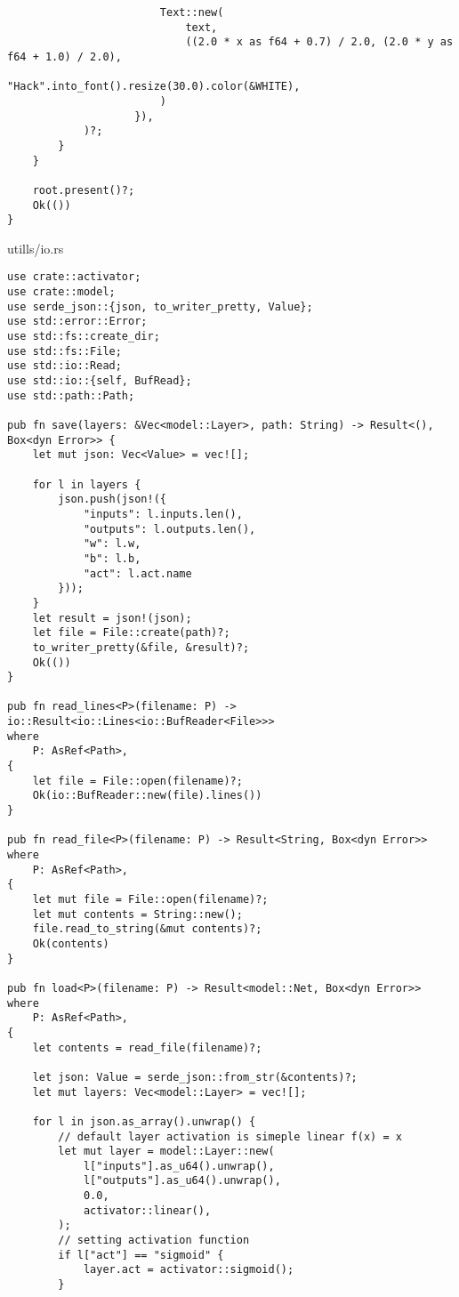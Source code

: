 \begin{verbatim}
                        Text::new(
                            text,
                            ((2.0 * x as f64 + 0.7) / 2.0, (2.0 * y as f64 + 1.0) / 2.0),
                            "Hack".into_font().resize(30.0).color(&WHITE),
                        )
                    }),
            )?;
        }
    }

    root.present()?;
    Ok(())
}
\end{verbatim}
\noindent utills/io.rs
\begin{verbatim}      
use crate::activator;
use crate::model;
use serde_json::{json, to_writer_pretty, Value};
use std::error::Error;
use std::fs::create_dir;
use std::fs::File;
use std::io::Read;
use std::io::{self, BufRead};
use std::path::Path;

pub fn save(layers: &Vec<model::Layer>, path: String) -> Result<(), Box<dyn Error>> {
    let mut json: Vec<Value> = vec![];

    for l in layers {
        json.push(json!({
            "inputs": l.inputs.len(),
            "outputs": l.outputs.len(),
            "w": l.w,
            "b": l.b,
            "act": l.act.name
        }));
    }
    let result = json!(json);
    let file = File::create(path)?;
    to_writer_pretty(&file, &result)?;
    Ok(())
}

pub fn read_lines<P>(filename: P) -> io::Result<io::Lines<io::BufReader<File>>>
where
    P: AsRef<Path>,
{
    let file = File::open(filename)?;
    Ok(io::BufReader::new(file).lines())
}

pub fn read_file<P>(filename: P) -> Result<String, Box<dyn Error>>
where
    P: AsRef<Path>,
{
    let mut file = File::open(filename)?;
    let mut contents = String::new();
    file.read_to_string(&mut contents)?;
    Ok(contents)
}

pub fn load<P>(filename: P) -> Result<model::Net, Box<dyn Error>>
where
    P: AsRef<Path>,
{
    let contents = read_file(filename)?;

    let json: Value = serde_json::from_str(&contents)?;
    let mut layers: Vec<model::Layer> = vec![];

    for l in json.as_array().unwrap() {
        // default layer activation is simeple linear f(x) = x
        let mut layer = model::Layer::new(
            l["inputs"].as_u64().unwrap(),
            l["outputs"].as_u64().unwrap(),
            0.0,
            activator::linear(),
        );
        // setting activation function
        if l["act"] == "sigmoid" {
            layer.act = activator::sigmoid();
        }


\end{verbatim}
